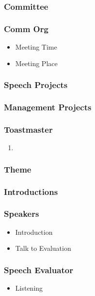 

\begin{frame}
\frametitle{Committee} 
\begin{itemize}

\end{itemize} 
\end{frame} 

\begin{frame} 
\frametitle{Comm Org} 

\begin{itemize} 
\item Meeting Time 
\item Meeting Place
\end{itemize}

\end{frame} 


\begin{frame}
\frametitle{Speech Projects} 
\end{frame} 


\begin{frame}
\frametitle{Management Projects}
\end{frame}



\begin{frame}
\frametitle{Toastmaster} 
\begin{enumerate} 
\tiny \item \tiny 
\end{enumerate} 
\end{frame} 

\begin{frame} 
\frametitle{Theme} 
\end{frame} 

\begin{frame}
\frametitle{Introductions}
\end{frame} 

\begin{frame}
\frametitle{Speakers}
\begin{itemize} 
\item Introduction
\item Talk to Evaluation
\end{itemize} 
\end{frame} 

\begin{frame}
\frametitle{Speech Evaluator} 
\begin{itemize} 
\item Listening 
\end{itemize}
\end{frame} 

